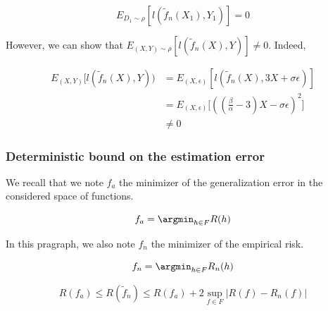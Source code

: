 \documentclass[
10pt, %
a4paper, %
oneside, %
headinclude,footinclude, %
BCOR5mm, %
]{scrartcl}
\begin{document}
    \begin{equation}
        E_{D_1\sim \rho}[l( \tilde{f}_n(X_1), Y_1)]=0
    \end{equation}

    However, we can show that $E_{(X,Y)\sim \rho}[l( \tilde{f}_n(X), Y)]\neq 0$. Indeed,

    \begin{equation*}
        \begin{aligned}
            \label{eq:}
            E_{(X,Y)}[l( \tilde{f}_n(X), Y))
            &=E_{(X,\epsilon)}[l( \tilde{f}_n(X), 3X+\sigma\epsilon)]\\
            &=E_{(X,\epsilon)}\big[( (\frac{\beta}{\alpha} - 3)X-\sigma\epsilon)^2\big]\\
            &\neq 0
        \end{aligned}
    \end{equation*}


    \subsubsection{\large\color{Periwinkle}Deterministic bound on the estimation error}

We recall that we note $f_a$ the minimizer of the generalization error in the
considered space of functions.

    \begin{equation}
        f_a = \argmin_{h\in F}R(h)
    \end{equation}

    In this pragraph, we also note $f_n$ the minimizer of the empirical risk.

    \begin{equation}
        f_n = \argmin_{h\in F}R_n(h)
    \end{equation}

    \begin{proposition}
	\label{prop:dilemma}
	\begin{equation}
	    R(f_a)\leq R( \tilde{f}_n)\leq R(f_a)+2 \sup_{f\in F}|R(f)- R_n(f)|
	\end{equation}
    \end{proposition}
\end{document}
